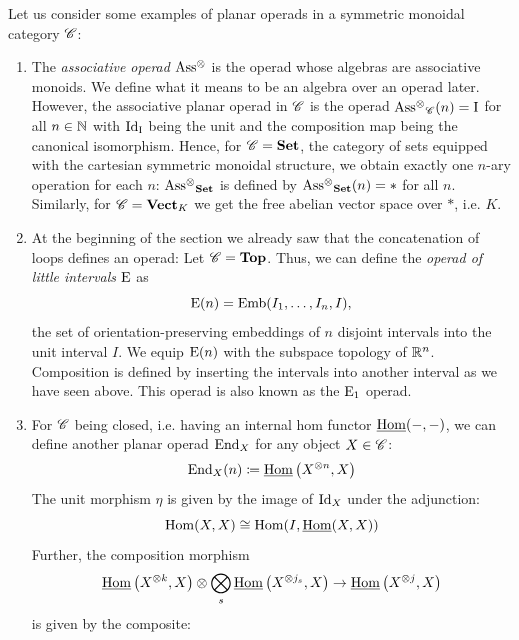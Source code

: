     \begin{egs}\label{egs_planar_operad} Let us consider some examples of planar
        operads in a symmetric monoidal category $\mathscr{C}$:
        \begin{enumerate} 
            \item The \textit{associative operad} $\operatorname{Ass^{\otimes}}$ is the operad whose
            algebras are associative monoids. We define what it means to be
            an algebra over an operad later. However, the associative planar
            operad in $\mathscr{C}$ is the operad $\operatorname{Ass^{\otimes}}_{\mathscr{C}}(n) = \operatorname{I}$ for all $n \in \mathbb{N}$
            with $\operatorname{Id}_{\operatorname{I}}$ being the unit and the composition map being the
            canonical isomorphism. Hence, for $\mathscr{C}=\operatorname{\textbf{Set}}$, the category of sets
            equipped with the cartesian symmetric monoidal structure, we obtain
            exactly one $n$-ary operation for each $n$: $\operatorname{Ass^{\otimes}}_{\operatorname{\textbf{Set}}}$ is defined
            by $\operatorname{Ass^{\otimes}}_{\operatorname{\textbf{Set}}}(n) = \ast$ for all $n$. Similarly, for $\mathscr{C} =
            \operatorname{\textbf{Vect}}_K$ we get the free abelian vector space over $\ast$, i.e. $K$.
            
        
            \item At the beginning of the section we already saw that the
            concatenation of loops defines an operad: Let $\mathscr{C} = \operatorname{\textbf{Top}}$. Thus, we
            can define the \textit{operad of little intervals} $\operatorname{E}$ as
            \[
                \operatorname{E}(n) = \operatorname{Emb}(I_1, \dots, I_n, I),
            \]
            the set of orientation-preserving embeddings of $n$ disjoint
            intervals into the unit interval $I$. We equip $\operatorname{E}(n)$ with the
            subspace topology of $\mathbb{R}^n$. Composition is defined by inserting the
            intervals into another interval as we have seen above. This operad
            is also known as the $\operatorname{E}_1$ operad.
            
            \item For $\mathscr{C}$ being closed, i.e. having an internal hom functor
            $\operatorname{\underline{Hom}}(-, -)$, we can define another planar operad $\operatorname{End}_X$ for any
            object $X \in \mathscr{C}$:
            \[
                \operatorname{End}_X(n) \coloneqq \operatorname{\underline{Hom}}\left(X^{\otimes n}, X\right)
            \]
            The unit morphism $\eta$ is given by the image of $\operatorname{Id}_X$ under the
            adjunction:
            \[
                \operatorname{Hom}(X,X) \cong \operatorname{Hom}(I, \operatorname{\underline{Hom}}(X,X))
            \]
            Further, the composition morphism 
            \[
                \operatorname{\underline{Hom}}\left(X^{\otimes k}, X\right) \otimes \bigotimes_s \operatorname{\underline{Hom}}\left(X^{\otimes j_s}, X\right) \to \operatorname{\underline{Hom}}\left(X^{\otimes j}, X\right)
            \]
            is given by the composite:
            

\end{enumerate}
\end{egs}

